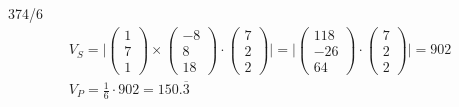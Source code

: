\begin{exercise}{374/6}
\begin{gather*}
    V_S = \Biggl|\begin{pmatrix}1 \\ 7 \\ 1\end{pmatrix} \times \begin{pmatrix}-8 \\ 8 \\ 18\end{pmatrix} \cdot \begin{pmatrix}7 \\ 2 \\ 2\end{pmatrix}\Biggr| = \Biggl|\begin{pmatrix}118 \\ -26 \\ 64\end{pmatrix} \cdot \begin{pmatrix}7 \\ 2 \\ 2\end{pmatrix}\Biggr| = 902 \\
    V_P = \frac{1}{6} \cdot 902 = 150.\overline{3}
  \end{gather*}
\end{exercise}


